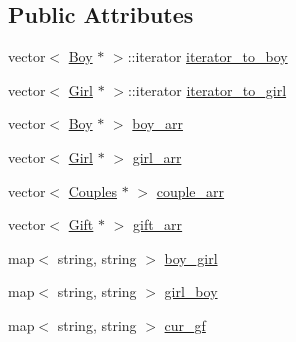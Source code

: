 \subsection*{Public Attributes}
\begin{DoxyCompactItemize}
\item 
vector$<$ \hyperlink{class_boy}{Boy} $\ast$ $>$\-::iterator \hyperlink{classq7_a3474053b58a5d054e8a6762c816d6728}{iterator\-\_\-to\-\_\-boy}
\item 
vector$<$ \hyperlink{class_girl}{Girl} $\ast$ $>$\-::iterator \hyperlink{classq7_a09a56f791e165e00017bf472a980bf8d}{iterator\-\_\-to\-\_\-girl}
\item 
vector$<$ \hyperlink{class_boy}{Boy} $\ast$ $>$ \hyperlink{classq7_aec35cf024f064050845895f828d51298}{boy\-\_\-arr}
\item 
vector$<$ \hyperlink{class_girl}{Girl} $\ast$ $>$ \hyperlink{classq7_a7a0797eb6886b0f63cef660d9d49e942}{girl\-\_\-arr}
\item 
vector$<$ \hyperlink{class_couples}{Couples} $\ast$ $>$ \hyperlink{classq7_aab715b0d48ac69f2920401830edf6b71}{couple\-\_\-arr}
\item 
vector$<$ \hyperlink{class_gift}{Gift} $\ast$ $>$ \hyperlink{classq7_a8370eca4c952b788a18e970431ecf014}{gift\-\_\-arr}
\item 
map$<$ string, string $>$ \hyperlink{classq7_a2232c64f17f45590eeffe4f276d0a36c}{boy\-\_\-girl}
\item 
map$<$ string, string $>$ \hyperlink{classq7_abc1af27d658e8ba3c6b0567b52ed711f}{girl\-\_\-boy}
\item 
map$<$ string, string $>$ \hyperlink{classq7_a4730e4b96cd44d58e4dc0c07dc632c71}{cur\-\_\-gf}
\end{DoxyCompactItemize}


